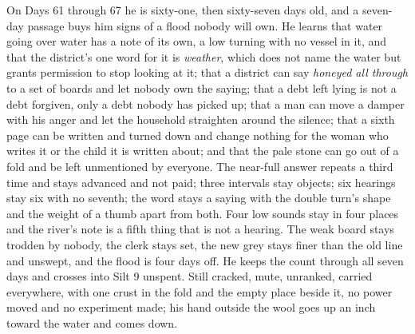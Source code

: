 \documentclass{design/chronicle}
\begin{document}
{On Days 61 through 67 he is sixty-one, then sixty-seven days old, and a seven-day passage buys him signs of a flood nobody will own. He learns that water going over water has a note of its own, a low turning with no vessel in it, and that the district’s one word for it is \emph{weather}, which does not name the water but grants permission to stop looking at it; that a district can say \emph{honeyed all through} to a set of boards and let nobody own the saying; that a debt left lying is not a debt forgiven, only a debt nobody has picked up; that a man can move a damper with his anger and let the household straighten around the silence; that a sixth page can be written and turned down and change nothing for the woman who writes it or the child it is written about; and that the pale stone can go out of a fold and be left unmentioned by everyone. The near-full answer repeats a third time and stays advanced and not paid; three intervals stay objects; six hearings stay six with no seventh; the word stays a saying with the double turn’s shape and the weight of a thumb apart from both. Four low sounds stay in four places and the river’s note is a fifth thing that is not a hearing. The weak board stays trodden by nobody, the clerk stays set, the new grey stays finer than the old line and unswept, and the flood is four days off. He keeps the count through all seven days and crosses into Silt 9 unspent. Still cracked, mute, unranked, carried everywhere, with one crust in the fold and the empty place beside it, no power moved and no experiment made; his hand outside the wool goes up an inch toward the water and comes down.

}
\end{document}
